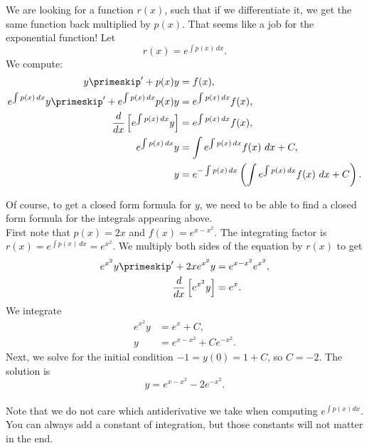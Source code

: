 We are looking for a function $r(x)$, such that if
we differentiate it, we get the same function back multiplied by $p(x)$.
That seems like a job for the exponential function!  Let
\begin{equation*}
r(x) = e^{\int p(x) \,dx} .
\end{equation*}
We compute:
\begin{align*}
y\primeskip ' + p(x) y &= f(x) , \\
e^{\int p(x) \,dx} y\primeskip ' + e^{\int p(x) \,dx} p(x) y & = e^{\int p(x) \,dx} f(x) , \\
\frac{d}{dx}\left[ e^{\int p(x) \,dx} y \right] & = e^{\int p(x) \,dx} f(x) , \\
e^{\int p(x) \,dx} y & = \int e^{\int p(x) \,dx} f(x) ~dx + C , \\
y & = e^{-\int p(x) \,dx} \left( \int e^{\int p(x) \,dx} f(x) ~dx + C \right) .
\end{align*}

Of course, to get a closed form formula for $y$,
we need to be able to find a
closed form formula for the integrals appearing above.\\

{
First note that $p(x) = 2x$ and $f(x) = e^{x-x^2}$.
The integrating factor is $r(x) = e^{\int p(x)\, dx} = e^{x^2}$.
We multiply both sides of the equation by $r(x)$ to get
\begin{align*}
e^{x^2} y\primeskip ' + 2xe^{x^2}y & = e^{x-x^2} e^{x^2} , \\
\frac{d}{dx} \left[ e^{x^2} y \right] &= e^x .
\end{align*}
We integrate
\begin{align*}
e^{x^2} y &= e^x +C , \\
y &= e^{x-x^2} + C e^{-x^2} .
\end{align*}
Next, we solve for the initial condition $-1 = y(0) = 1 + C$, so $C=-2$.
The solution is
\begin{equation*}
y = e^{x-x^2} - 2 e^{-x^2} .
\end{equation*}
}\\

Note that we do not care which antiderivative we take when computing
$e^{\int p(x) dx}$.  You can always add a constant of integration,
but those constants
will not matter in the end.


